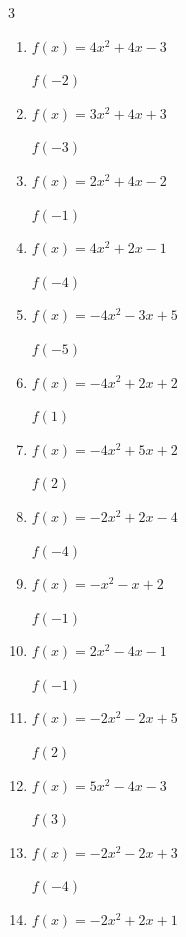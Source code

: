 \begin{multicols}{3}
\begin{enumerate}
$f(-2)$
        \phantom{$= -17$}

  \item $f(x)=4x^{2}+4x-3$

$f(-2)$
        \phantom{$= 5$}

  \item $f(x)=3x^{2}+4x+3$

$f(-3)$
        \phantom{$= 18$}

  \item $f(x)=2x^{2}+4x-2$

$f(-1)$
        \phantom{$= -4$}

  \item $f(x)=4x^{2}+2x-1$

$f(-4)$
        \phantom{$= 55$}

  \item $f(x)=-4x^{2}-3x+5$

$f(-5)$
        \phantom{$= -80$}

\columnbreak %

  \item $f(x)=-4x^{2}+2x+2$

$f(1)$
        \phantom{$= 0$}

  \item $f(x)=-4x^{2}+5x+2$

$f(2)$
        \phantom{$= -4$}

  \item $f(x)=-2x^{2}+2x-4$

$f(-4)$
        \phantom{$= -44$}

  \item $f(x)=-x^{2}-x+2$

$f(-1)$
        \phantom{$= 2$}

  \item $f(x)=2x^{2}-4x-1$

$f(-1)$
        \phantom{$= 5$}

  \item $f(x)=-2x^{2}-2x+5$

$f(2)$
        \phantom{$= -7$}

  \item $f(x)=5x^{2}-4x-3$

$f(3)$
        \phantom{$= 30$}

  \item $f(x)=-2x^{2}-2x+3$

$f(-4)$
        \phantom{$= -21$}

  \item $f(x)=-2x^{2}+2x+1$


\end{enumerate}
\end{multicols}
